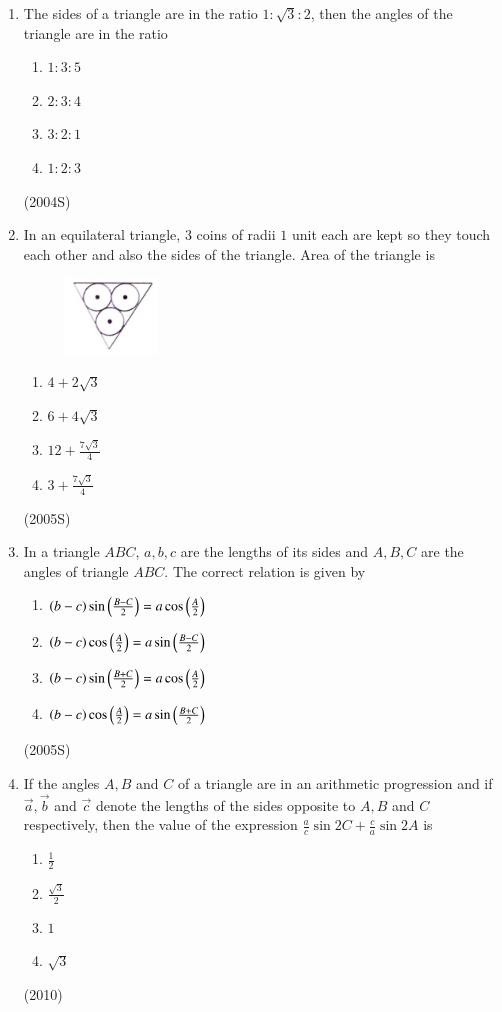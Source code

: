 \begin{enumerate}[label=\thesubsection.\arabic*,ref=\thesubsection.\theenumi]
\item The sides of a triangle are in the ratio $1\colon\sqrt{3}\colon2$, then the angles of the triangle are in the ratio
\begin{enumerate}
\item $1\colon3\colon5$
\item $2\colon3\colon4$
\item $3\colon2\colon1$
\item $1\colon2\colon3$
\end{enumerate}
\hfill (2004S)

\item In an equilateral triangle, $3$ coins of radii $1$ unit each are kept so they touch each other and also the sides of the triangle. Area of the triangle is 
\begin{figure}[htp]
    \centering
    \includegraphics[width=2.5cm]{figs/figure.png}
    \label{fig:figure}
\end{figure}
\begin{enumerate}
\item $4+2\sqrt{3}$
\item $6+4\sqrt{3}$
\item $12+\frac{7\sqrt{3}}{4}$
\item $3+\frac{7\sqrt{3}}{4}$
\end{enumerate}
\hfill (2005S)

\item In a triangle $ABC$, $a, b, c$  are the lengths of its sides and $A, B, C$ are the angles of triangle $ABC$. The correct relation is given by
\begin{enumerate}
\item $\left(b-c\right) \sin \left(\frac{B-C}{2}\right) = a \cos \left(\frac{A}{2}\right)$
\item $\left(b-c\right) \cos \left(\frac{A}{2}\right) = a \sin \left(\frac{B-C}{2}\right)$
\item $\left(b-c\right) \sin \left(\frac{B+C}{2}\right) = a \cos \left(\frac{A}{2}\right)$
\item $\left(b-c\right) \cos \left(\frac{A}{2}\right) = a \sin \left(\frac{B+C}{2}\right)$
\end{enumerate}
\hfill (2005S)

\item If the angles $A, B$ and $C$ of a triangle are in an arithmetic progression and if $\vec{a}, \vec{b}$ and $\vec{c}$ denote the lengths of the sides opposite to $A, B$ and $C$ respectively, then the value of the expression $\frac{a}{c}\sin 2C + \frac{c}{a} \sin 2A$ is
\begin{enumerate}
\item $\frac{1}{2}$
\item $\frac{\sqrt{3}}{2}$
\item $1$
\item $\sqrt{3}$
\end{enumerate}
\hfill (2010)


\end{enumerate}
